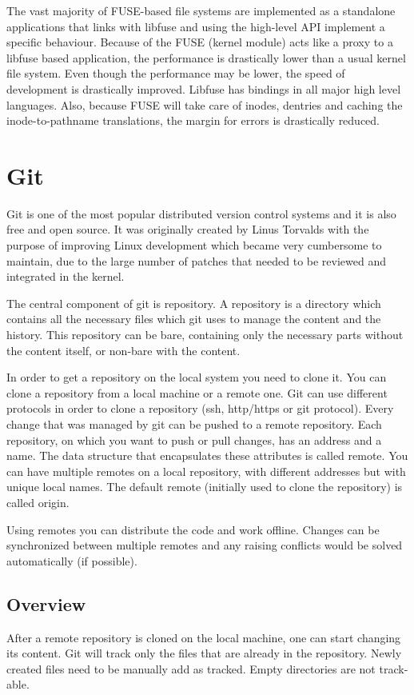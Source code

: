         The vast majority of FUSE-based file systems are implemented as a standalone applications that links with libfuse and using the high-level API implement a specific behaviour. Because of the FUSE (kernel module) acts like a proxy to a libfuse based application, the performance is drastically lower than a usual kernel file system. Even though the performance may be lower, the speed of development is drastically improved. Libfuse has bindings in all major high level languages. Also, because FUSE will take care of inodes, dentries and caching the inode-to-pathname translations, the margin for errors is drastically reduced.
        
\section{Git}
    Git is one of the most popular distributed version control systems and it is also free and open source. It was originally created by Linus Torvalds with the purpose of improving Linux development which became very cumbersome to maintain, due to the large number of patches that needed to be reviewed and integrated in the kernel.
    
    The central component of git is repository. A repository is a directory which contains all the necessary files which git uses to manage the content and the history. This repository can be bare, containing only the necessary parts without the content itself, or non-bare with the content.
    
    In order to get a repository on the local system you need to clone it. You can clone a repository from a local machine or a remote one. Git can use different protocols in order to clone a repository (ssh, http/https or git protocol). Every change that was managed by git can be pushed to a remote repository. Each repository, on which you want to push or pull changes, has an address and a name. The data structure that encapsulates these attributes is called remote. You can have multiple remotes on a local repository, with different addresses but with unique local names. The default remote (initially used to clone the repository) is called origin.
    
    Using remotes you can distribute the code and work offline. Changes can be synchronized between multiple remotes and any raising conflicts would be solved automatically (if possible).
    
    \subsection{Overview}
        After a remote repository is cloned on the local machine, one can start changing its content. Git will track only the files that are already in the repository. Newly created files need to be manually add as tracked. Empty directories are not track-able.
        
